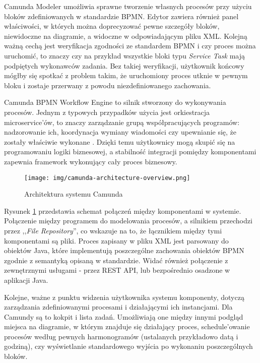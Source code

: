 \documentclass[declaration,shortabstract,mgr]{iithesis}
\newcommand{\bpmn}{BPMN }
\newcommand{\bpmnnospace}{BPMN}
\begin{document}
Camunda Modeler umożliwia sprawne tworzenie własnych procesów przy użyciu bloków zdefiniowanych w standardzie \bpmnnospace. Edytor zawiera również panel właściwości, w których można doprecyzować pewne szczegóły bloków, niewidoczne na diagramie, a widoczne w odpowiadającym pliku XML. Kolejną ważną cechą jest weryfikacja zgodności ze standardem \bpmn i czy proces można uruchomić, to znaczy czy na przykład wszystkie bloki typu \textit{Service Task} mają podpiętych wykonawców zadania. Bez takiej weryfikacji, użytkownik końcowy mógłby się spotkać z problem takim, że uruchomiony proces utknie w pewnym bloku i zostaje przerwany z powodu niezdefiniowanego zachowania.

Camunda BPMN Workflow Engine to silnik stworzony do wykonywania procesów. Jednym z typowych przypadków użycia jest orkiestracja microservice'ów, to znaczy zarządzanie grupą współpracujących programów: nadzorowanie ich, koordynacja wymiany wiadomości czy upewnianie się, że zostały właściwie wykonane \cite{camunda-orchestration}. Dzięki temu użytkownicy mogą skupić się na programowaniu logiki biznesowej, a stabilność integracji pomiędzy komponentami zapewnia framework wykonujący cały proces biznesowy.

\begin{figure}
    \texttt{[image: img/camunda-architecture-overview.png]}
    \caption{Architektura systemu Camunda \cite{camunda-docs-introduction}}
    \label{fig:camunda-overview}
\end{figure}

Rysunek \ref{fig:camunda-overview} przedstawia schemat połączeń między komponentami w systemie. Połączenie między programem do modelowania procesów, a silnikiem przechodzi przez ,,\textit{File Repository}'', co wskazuje na to, że łącznikiem między tymi komponentami są pliki. Proces zapisany w pliku XML jest parsowany do obiektów Java, które implementują poszczególne zachowania obiektów \bpmn zgodnie z semantyką opisaną w standardzie. Widać również połączenie z zewnętrznymi usługami - przez REST API, lub bezpośrednio osadzone w aplikacji Java.

Kolejne, ważne z punktu widzenia użytkownika systemu komponenty, dotyczą zarządzania zdefiniowanymi procesami i działającymi ich instancjami. Dla Camundy są to kokpit i lista zadań. Umożliwiają one między innymi podgląd miejsca na diagramie, w którym znajduje się działający proces, schedule'owanie procesów według pewnych harmonogramów (ustalanych przykładowo datą i godziną), czy wyświetlanie standardowego wyjścia po wykonaniu poszczególnych bloków.
\end{document}
